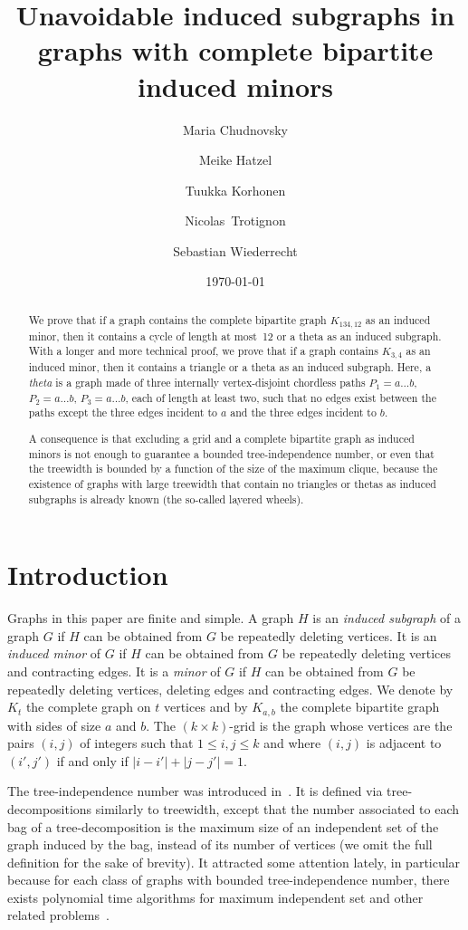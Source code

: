 \documentclass[11pt]{article}
\title{Unavoidable induced subgraphs in graphs with complete bipartite induced minors}
\author[1]{Maria Chudnovsky}
\author[2]{Meike Hatzel}
\author[3]{Tuukka Korhonen}
\author[4]{Nicolas~Trotignon}
\author[5]{Sebastian Wiederrecht}
\affil[1]{Princeton University, Princeton, NJ 08544, USA}
\affil[2]{Discrete Mathematics Group, Institute for Basic Science,
  Daejeon, South Korea}
\affil[3]{University of Copenhagen, Denmark}
\affil[4]{CNRS, ENS de Lyon, Université Claude Bernard Lyon 1, LIP,
  UMR~5668, Lyon, France}
\affil[5]{KAIST, Daejeon, South Korea}
\date{\today}
\theoremstyle{definition}
\theoremstyle{definition}
\begin{document}
\maketitle

\begin{abstract}
We prove that if a graph contains the complete bipartite graph $K_{134, 12}$ as an induced minor, then it contains a cycle of length at most~12 or a theta as an induced subgraph.  With a longer and more technical proof, we prove that if a graph contains $K_{3, 4}$ as an induced minor, then it contains a triangle or a theta as an induced subgraph. Here, a \emph{theta} is a graph made of three internally vertex-disjoint chordless paths $P_1 = a \dots b$, $P_2 = a \dots b$, $P_3 = a \dots b$, each of length at least two, such that no edges exist between the paths except the three edges incident
to $a$ and the three edges incident to $b$.


A consequence is that excluding a grid and a complete bipartite graph as induced minors is not enough to guarantee a bounded tree-independence number, or even that the treewidth is bounded by a function of the size of the maximum clique, because the existence of graphs with large treewidth that contain no triangles or thetas as induced subgraphs is already known (the so-called layered wheels). 
\end{abstract}




\section{Introduction}

Graphs in this paper are finite and simple. A graph $H$ is an
\emph{induced subgraph} of a graph $G$ if $H$ can be obtained from $G$
be repeatedly deleting vertices. It is an \emph{induced minor} of $G$
if $H$ can be obtained from $G$ be repeatedly deleting vertices and
contracting edges.  It is a \emph{minor} of $G$ if $H$ can be obtained
from $G$ be repeatedly deleting vertices, deleting edges and
contracting edges.  We denote by $K_t$ the complete graph on $t$ vertices and by $K_{a,b}$ the complete bipartite graph  with sides of size $a$ and $b$.  The $(k\times k)$-grid is the graph whose vertices are the pairs $(i, j)$ of integers such that $1\leq i, j \leq k$ and where $(i, j)$ is adjacent to $(i', j')$ if and only if $|i-i'| + |j-j'| = 1$.  

The tree-independence number was introduced
in~\cite{DBLP:journals/jctb/DallardMS24}. 
It is defined via tree-decompositions similarly to treewidth, except that the number associated to each bag of a tree-decomposition is the maximum size of an independent set of the graph induced by the bag, instead of its number of vertices (we omit the full definition for the sake of brevity).
It attracted some attention lately, in particular because for each class of graphs with bounded
tree-independence number, there exists polynomial time algorithms for maximum independent set and other related problems~\cite{DBLP:journals/jctb/DallardMS24,DBLP:conf/icalp/DallardFGKM24,DBLP:conf/esa/LimaMMORS24,DBLP:conf/soda/Yolov18}.
\end{document}
